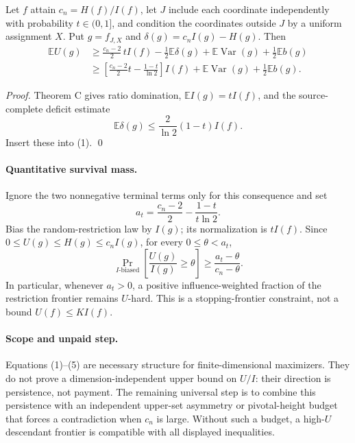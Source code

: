 \begin{corollary}
Let $f$ attain $c_n=H(f)/I(f)$, let $J$ include each coordinate independently
with probability $t\in(0,1]$, and condition the coordinates outside $J$ by a
uniform assignment $X$.  Put $g=f_{J,X}$ and
$\delta(g)=c_nI(g)-H(g)$.  Then
\[
\begin{split}
 \mathbb E U(g)
 &\ge \frac{c_n-2}{2}\,tI(f)-\frac12\mathbb E\delta(g)
       +\mathbb E\operatorname{Var}(g)+\frac12\mathbb E b(g)             \tag{3}\\
 &\ge \left[\frac{c_n-2}{2}t-\frac{1-t}{\ln2}\right]I(f)
       +\mathbb E\operatorname{Var}(g)+\frac12\mathbb E b(g).           \tag{4}
\end{split}
\]
\end{corollary}

\begin{proof}
Theorem C gives ratio domination, $\mathbb E I(g)=tI(f)$, and the
source-complete deficit estimate
\[
 \mathbb E\delta(g)\le\frac{2}{\ln2}(1-t)I(f).
\]
Insert these into (1).  \qed
\end{proof}

\paragraph{Quantitative survival mass.}
Ignore the two nonnegative terminal terms only for this consequence and set
\[
 a_t=\frac{c_n-2}{2}-\frac{1-t}{t\ln2}.
\]
Bias the random-restriction law by $I(g)$; its normalization is $tI(f)$.
Since $0\le U(g)\le H(g)\le c_nI(g)$, for every $0\le\theta<a_t$,
\[
 \Pr_{I\text{-biased}}\left[\frac{U(g)}{I(g)}\ge\theta\right]
 \ge\frac{a_t-\theta}{c_n-\theta}.                         \tag{5}
\]
In particular, whenever $a_t>0$, a positive influence-weighted fraction of
the restriction frontier remains $U$-hard.  This is a stopping-frontier
constraint, not a bound $U(f)\le KI(f)$.

\paragraph{Scope and unpaid step.}
Equations (1)--(5) are necessary structure for finite-dimensional maximizers.
They do not prove a dimension-independent upper bound on $U/I$: their direction
is persistence, not payment.  The remaining universal step is to combine this
persistence with an independent upper-set asymmetry or pivotal-height budget
that forces a contradiction when $c_n$ is large.  Without such a budget, a
high-$U$ descendant frontier is compatible with all displayed inequalities.

